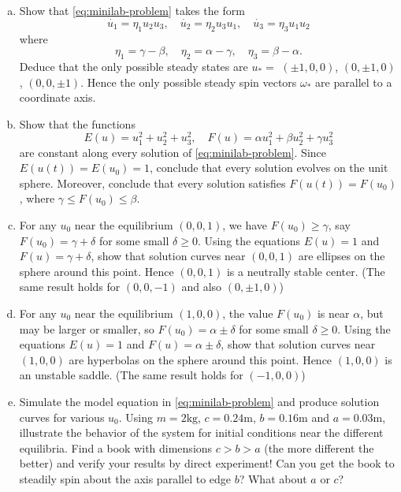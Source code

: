 \documentclass[12pt]{article}
\begin{document}
\begin{enumerate}[(a)]
\item Show that \cref{eq:minilab-problem} takes the form
  \begin{equation*}
    \dot{u_1}=\eta_1u_2u_3,\quad\dot{u_2}=\eta_2u_3u_1,\quad\dot{u_3}=\eta_3u_1u_2
  \end{equation*}
  where
  \begin{equation*}
    \eta_1=\gamma-\beta,\quad\eta_2=\alpha-\gamma,\quad\eta_3=\beta-\alpha.
  \end{equation*}
  Deduce that the only possible steady states are $u_*=$ $(\pm1,0,0)$,
  $(0,\pm1,0)$, $(0,0,\pm1)$. Hence the only possible steady spin vectors
  $\omega_*$ are parallel to a coordinate axis.
\item Show that the functions
  \begin{equation*}
    E(u) = u_1^2+u_2^2+u_3^2,\quad F(u)=\alpha u_1^2+\beta u_2^2+\gamma u_3^2
  \end{equation*}
  are constant along every solution of \cref{eq:minilab-problem}. Since $E(u(t))
  = E(u_0) = 1$, conclude that every solution evolves on the unit sphere.
  Moreover, conclude that every solution satisfies $F(u(t)) = F(u_0)$, where
  $\gamma\le F(u_0)\le\beta$.
\item For any $u_0$ near the equilibrium $(0, 0, 1)$, we have $F (u_0) \ge
  \gamma$, say $F (u_0) = \gamma + \delta$ for some small $\delta\ge0$. Using
  the equations $E(u) = 1$ and $F(u) = \gamma + \delta$, show that solution
  curves near $(0, 0, 1)$ are ellipses on the sphere around this point. Hence
  $(0, 0, 1)$ is a neutrally stable center. (The same result holds for $(0, 0,
  −1)$ and also $(0, \pm1, 0)$)
\item For any $u_0$ near the equilibrium $(1, 0, 0)$, the value $F(u_0)$ is near
  $\alpha$, but may be larger or smaller, so $F(u_0) = \alpha\pm\delta$ for some
  small $\delta\ge0$. Using the equations $E(u) = 1$ and $F(u) =
  \alpha\pm\delta$, show that solution curves near $(1, 0, 0)$ are hyperbolas on
  the sphere around this point. Hence $(1, 0, 0)$ is an unstable saddle. (The
  same result holds for $(−1, 0, 0)$)
\item Simulate the model equation in \cref{eq:minilab-problem} and produce
  solution curves for various $u_0$. Using $m = 2\text{kg}$, $c = 0.24\text{m}$,
  $b = 0.16\text{m}$ and $a = 0.03\text{m}$, illustrate the behavior of the
  system for initial conditions near the different equilibria. Find a book with
  dimensions $c > b > a$ (the more different the better) and verify your results
  by direct experiment! Can you get the book to steadily spin about the axis
  parallel to edge $b$? What about $a$ or $c$?
\end{enumerate}
\newpage
\end{document}
